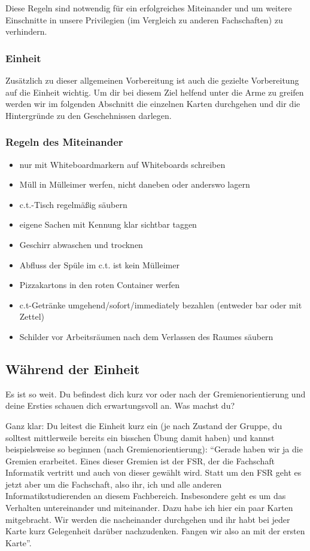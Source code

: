 \documentclass[a4paper,11pt]{scrartcl} %
\newenvironment{myitemize}{\begin{itemize}\itemsep -2pt}{\end{itemize}} %
\begin{document}
Diese Regeln sind notwendig für ein erfolgreiches Miteinander und um weitere Einschnitte in unsere Privilegien (im Vergleich zu anderen Fachschaften) zu verhindern.

\subsubsection*{Einheit}

Zusätzlich zu dieser allgemeinen Vorbereitung ist auch die gezielte Vorbereitung auf die Einheit wichtig. Um dir bei diesem Ziel helfend unter die Arme zu greifen werden wir im folgenden Abschnitt die einzelnen Karten durchgehen und dir die Hintergründe zu den Geschehnissen darlegen.

\subsubsection*{Regeln des Miteinander}
\begin{myitemize}
	\item nur mit Whiteboardmarkern auf Whiteboards schreiben
	\item Müll in Mülleimer werfen, nicht daneben oder anderswo lagern
	\item c.t.-Tisch regelmäßig säubern
	\item eigene Sachen mit Kennung klar sichtbar taggen
	\item Geschirr abwaschen und trocknen
	\item Abfluss der Spüle im c.t. ist kein Mülleimer
	\item Pizzakartons in den roten Container werfen
	\item c.t-Getränke umgehend/sofort/immediately bezahlen (entweder bar oder mit Zettel)
	\item Schilder vor Arbeitsräumen nach dem Verlassen des Raumes säubern
\end{myitemize}


  \subsection{Während der Einheit}
Es ist so weit. Du befindest dich kurz vor oder nach der Gremienorientierung und deine Ersties schauen dich erwartungsvoll an. Was machst du?

Ganz klar: Du leitest die Einheit kurz ein (je nach Zustand der Gruppe, du solltest mittlerweile bereits ein bisschen Übung damit haben) und kannst beispielsweise so beginnen (nach Gremienorientierung): "`Gerade haben wir ja die Gremien erarbeitet. Eines dieser Gremien ist der FSR, der die Fachschaft Informatik vertritt und auch von dieser gewählt wird. Statt um den FSR geht es jetzt aber um die Fachschaft, also ihr, ich und alle anderen Informatikstudierenden an diesem Fachbereich.
Insbesondere geht es um das Verhalten untereinander und miteinander. Dazu habe ich hier ein paar Karten mitgebracht. Wir werden die nacheinander durchgehen und ihr habt bei jeder Karte kurz Gelegenheit darüber nachzudenken. Fangen wir also an mit der ersten Karte"'. 
\end{document}
